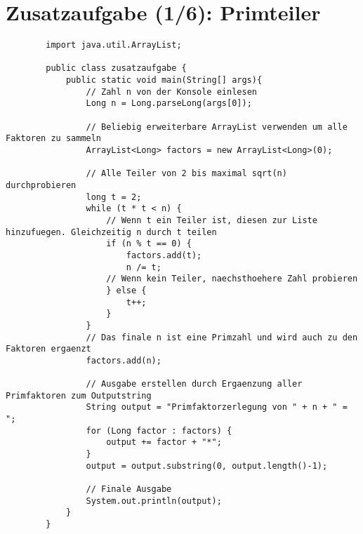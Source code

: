 \documentclass{article}
\begin{document}
    \section*{Zusatzaufgabe (1/6): Primteiler}
    \begin{lstlisting}
        import java.util.ArrayList;

        public class zusatzaufgabe {
            public static void main(String[] args){
                // Zahl n von der Konsole einlesen
                Long n = Long.parseLong(args[0]);

                // Beliebig erweiterbare ArrayList verwenden um alle Faktoren zu sammeln
                ArrayList<Long> factors = new ArrayList<Long>(0);

                // Alle Teiler von 2 bis maximal sqrt(n) durchprobieren
                long t = 2;
                while (t * t < n) {
                    // Wenn t ein Teiler ist, diesen zur Liste hinzufuegen. Gleichzeitig n durch t teilen
                    if (n % t == 0) {
                        factors.add(t);
                        n /= t;
                    // Wenn kein Teiler, naechsthoehere Zahl probieren
                    } else {
                        t++;
                    }
                }
                // Das finale n ist eine Primzahl und wird auch zu den Faktoren ergaenzt
                factors.add(n);

                // Ausgabe erstellen durch Ergaenzung aller Primfaktoren zum Outputstring
                String output = "Primfaktorzerlegung von " + n + " = ";
                for (Long factor : factors) {
                    output += factor + "*";
                }
                output = output.substring(0, output.length()-1);

                // Finale Ausgabe
                System.out.println(output);
            }
        }
    \end{lstlisting}
\end{document}
